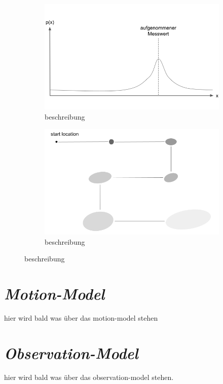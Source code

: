 \mbox{}
\begin{figure}
  \begin{subfigure}[t]{.5\textwidth}
    \centering
    \includegraphics[width=.8\linewidth]{pic/vorwissen/3a_messunggauss.png}
    \caption{beschreibung}
    \label{fig:3a_messunggauss}
  \end{subfigure}\hfill
  \begin{subfigure}[t]{.5\textwidth}
    \centering
    \includegraphics[width=.8\linewidth]{pic/vorwissen/3b_growinguncertainty.png}
    \caption{beschreibung}
    \label{fig:3b_growing_uncertainty}
  \end{subfigure}
\end{figure}
\mbox{}



\section{\textit{Motion-Model}}\label{sec:Motion-Model}
hier wird bald was über das motion-model stehen

\section{\textit{Observation-Model}}\label{sec:Observation-Model}
hier wird bald was über das observation-model stehen.



